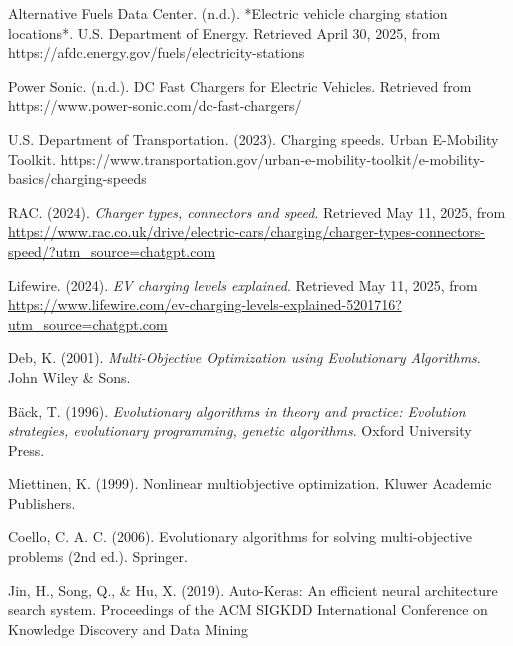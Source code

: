\begin{thebibliography}{99}
    Alternative Fuels Data Center. (n.d.). *Electric vehicle charging station locations*. U.S. Department of Energy. Retrieved April 30, 2025, from https://afdc.energy.gov/fuels/electricity-stations

    Power Sonic. (n.d.). DC Fast Chargers for Electric Vehicles. Retrieved from https://www.power-sonic.com/dc-fast-chargers/

     U.S. Department of Transportation. (2023). Charging speeds. Urban E-Mobility Toolkit. https://www.transportation.gov/urban-e-mobility-toolkit/e-mobility-basics/charging-speeds

    RAC. (2024). \textit{Charger types, connectors and speed}. Retrieved May 11, 2025, from \url{https://www.rac.co.uk/drive/electric-cars/charging/charger-types-connectors-speed/?utm_source=chatgpt.com}
    
    Lifewire. (2024). \textit{EV charging levels explained}. Retrieved May 11, 2025, from \url{https://www.lifewire.com/ev-charging-levels-explained-5201716?utm_source=chatgpt.com}

    
    Deb, K. (2001). \textit{Multi-Objective Optimization using Evolutionary Algorithms}. John Wiley \& Sons.

     Bäck, T. (1996). \textit{Evolutionary algorithms in theory and practice: Evolution strategies, evolutionary programming, genetic algorithms}. Oxford University Press.
    
    Miettinen, K. (1999). Nonlinear multiobjective optimization. Kluwer Academic Publishers.

     Coello, C. A. C. (2006). Evolutionary algorithms for solving multi-objective problems (2nd ed.). Springer.

     Jin, H., Song, Q., \& Hu, X. (2019). Auto-Keras: An efficient neural architecture search system. Proceedings of the ACM SIGKDD International Conference on Knowledge Discovery and Data Mining


\end{thebibliography}
